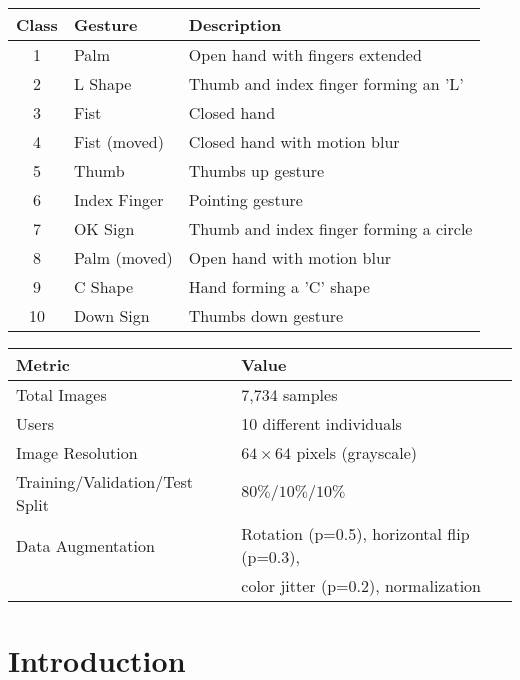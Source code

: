 \documentclass[11pt,a4paper,twoside]{article}
\begin{document}
\begin{infobox}
\centering
\small
\begin{tabularx}{0.98\textwidth}{|c|l|X|}
\hline
\rowcolor{tableheader}
\textbf{Class} & \textbf{Gesture} & \textbf{Description} \\
\hline
1 & Palm & Open hand with fingers extended \\
\hline
2 & L Shape & Thumb and index finger forming an 'L' \\
\hline
3 & Fist & Closed hand \\
\hline
4 & Fist (moved) & Closed hand with motion blur \\
\hline
5 & Thumb & Thumbs up gesture \\
\hline
6 & Index Finger & Pointing gesture \\
\hline
7 & OK Sign & Thumb and index finger forming a circle \\
\hline
8 & Palm (moved) & Open hand with motion blur \\
\hline
9 & C Shape & Hand forming a 'C' shape \\
\hline
10 & Down Sign & Thumbs down gesture \\
\hline
\end{tabularx}
\end{infobox}


\begin{warningbox}
\centering
\small
\begin{tabularx}{0.7\textwidth}{|l|X|}
\hline
\textbf{Metric} & \textbf{Value} \\
\hline
Total Images & 7,734 samples \\
\hline
Users & 10 different individuals \\
\hline
Image Resolution & $64\times 64$ pixels (grayscale) \\
\hline
Training/Validation/Test Split & $80\%/10\%/10\%$ \\
\hline
Data Augmentation & Rotation (p=0.5), horizontal flip (p=0.3), \\ & color jitter (p=0.2), normalization \\
\hline
\end{tabularx}
\end{warningbox}

\section{Introduction}\label{i.-introduction}
\end{document}
